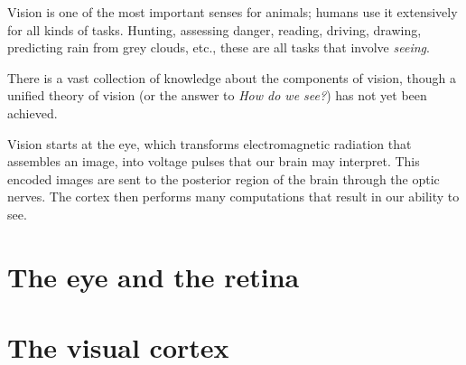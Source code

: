 Vision is one of the most important senses for animals; humans use it extensively for all kinds of tasks. Hunting, assessing danger, reading, driving, drawing, predicting rain from grey clouds, etc., these are all tasks that involve \emph{seeing}. 

There is a vast collection of knowledge about the components of vision, though a unified theory of vision (or the answer to \emph{How do we see?}) has not yet been achieved.

Vision starts at the eye, which transforms electromagnetic radiation that assembles an image, into voltage pulses that our brain may interpret. This encoded images are sent to the posterior region of the brain through the optic nerves. The cortex then performs many computations that result in our ability to see.

\section{The eye and the retina}
\label{sec:vision:eye}


\section{The visual cortex}
\label{sec:vision:cortex}


%
